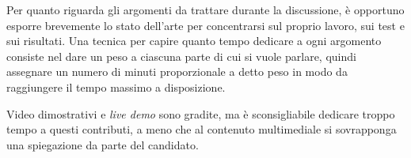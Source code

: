 \documentclass[12pt]{report}
\begin{document}
Per quanto riguarda gli argomenti da trattare durante la discussione, è opportuno esporre brevemente lo stato dell'arte per concentrarsi sul proprio lavoro, sui test e sui risultati. Una tecnica per capire quanto tempo dedicare a ogni argomento consiste nel dare un peso a ciascuna parte di cui si vuole parlare, quindi assegnare un numero di minuti proporzionale a detto peso in modo da raggiungere il tempo massimo a disposizione.

Video dimostrativi e \textit{live demo} sono gradite, ma è sconsigliabile dedicare troppo tempo a questi contributi, a meno che al contenuto multimediale si sovrapponga una spiegazione da parte del candidato.


%
%

\beforebibliography



\closingpage
\end{document}
